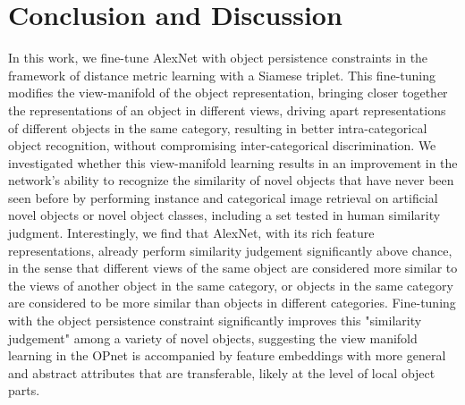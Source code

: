 \documentclass{article} %
\begin{document}
\section{Conclusion and Discussion}

In this work, we fine-tune AlexNet with object persistence constraints in the framework of distance metric learning with a Siamese triplet. This fine-tuning modifies the view-manifold of the object representation, bringing closer together the representations of an object in different views, driving apart representations of different objects in the same category, resulting in better intra-categorical object recognition, without compromising inter-categorical discrimination. We investigated whether this view-manifold learning results in an improvement in the network's ability to recognize the similarity of novel objects that have never been seen before by performing instance and categorical image retrieval on artificial novel objects or novel object classes, including a set  tested in human similarity judgment.  Interestingly, we find that AlexNet, with its rich feature representations, already perform similarity judgement significantly above chance, in the sense that different views of the same object are considered more similar to the views of another object in the same category, or objects in the same category are considered to be more similar than objects in  different categories. Fine-tuning with the object persistence constraint significantly improves this "similarity judgement" among a variety of novel objects,  suggesting the view manifold learning in the OPnet is accompanied by feature embeddings with more general and abstract attributes that are transferable, likely at the level of local object parts. 
\end{document}
